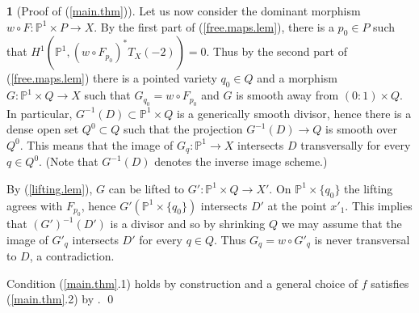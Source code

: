 \documentclass[12pt,twoside]{amsart}
\newcommand{\p}[0]{{\mathbb P}}
\theoremstyle{definition}
\newtheorem{say}[thm]{}
\theoremstyle{remark}
\begin{document}
\begin{say}[Proof of (\ref{main.thm})]
Let us now consider the dominant morphism $w\circ F:\p^1\times P\to X$. 
By the first part of (\ref{free.maps.lem}), there is a $p_0\in P$ such that
$H^1(\p^1, (w\circ F_{p_0})^*T_X(-2))=0$. 
Thus by the second part of (\ref{free.maps.lem}) 
there is a pointed variety $q_0\in Q$ and a morphism
$G: \p^1\times Q\to X$ such that 
$G_{q_0}=w\circ F_{p_0}$ and 
$G$ is smooth away from
$(0{\colon\!} 1)\times Q$. In particular, $G^{-1}(D)\subset \p^1\times Q$
is a  generically  smooth divisor, hence  there is a dense open set
$Q^0\subset Q$ such that the projection
$G^{-1}(D)\to Q$ is smooth over $Q^0$.
This means that 
the image of $G_q:\p^1\to X$
intersects $D$ transversally for every $q\in Q^0$.
(Note that $G^{-1}(D)$ denotes the inverse image scheme.)

By (\ref{lifting.lem}), $G$ can be lifted to
$G':\p^1\times Q\to X'$. On  $\p^1\times \{q_0\}$ the lifting
agrees with  $F_{p_0}$,  hence $G'(\p^1\times  \{q_0\})$
intersects $D'$ at the point $x'_1$. This implies that
$(G')^{-1}(D')$ is a divisor and so by shrinking $Q$
we may assume that the image of $G'_q$ intersects $D'$ for every
$q\in Q$. Thus  $G_q=w\circ G'_q$ is never transversal to
$D$, a contradiction.


Condition (\ref{main.thm}.1) holds by construction and
a general choice of $f$ satisfies
(\ref{main.thm}.2) by \cite[II.3.14]{rcbook}.
\qed 
  \end{say}
\end{document}
